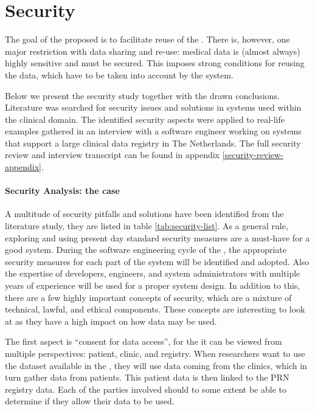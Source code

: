 \section{Security}
\label{security}

The goal of the proposed \ivfsystem{} is to facilitate reuse of the \projectdata{}.
There is, however, one major restriction with data sharing and re-use: medical data is (almost always) highly sensitive and must be secured. 
This imposes strong conditions for reusing the data, which have to be taken into account by the system.

Below we present the security study together with the drawn conclusions.
Literature was searched for security issues and solutions in systems used within the clinical domain.
The identified security aspects were applied to real-life examples gathered in an interview with a software engineer working on systems that support a large clinical data registry in The Netherlands.
The full security review and interview transcript can be found in appendix \ref{security-review-appendix}.

\paragraph{Security Analysis: the \ivfsystem{} case}
\label{security-summarisation-analysis}

A multitude of security pitfalls and solutions have been identified from the literature study, they are listed in table \ref{tab:security-list}.
As a general rule, exploring and using present day standard security measures are a must-have for a good system.
During the software engineering cycle of the \ivfsystem{}, the appropriate security measures for each part of the system will be identified and adopted.
Also the expertise of developers, engineers, and system administrators with multiple years of experience will be used for a proper system design.
In addition to this, there are a few highly important concepts of security, which are a mixture of technical, lawful, and ethical components.
These concepts are interesting to look at as they have a high impact on how data may be used.

The first aspect is ``consent for data access'', for the \project{} it can be viewed from multiple perspectives: patient, clinic, and registry.
When researchers want to use the dataset available in the \ivfsystem{}, they will use data coming from the clinics, which in turn gather data from patients.
This patient data is then linked to the PRN registry data.
Each of the parties involved should to some extent be able to determine if they allow their data to be used.

